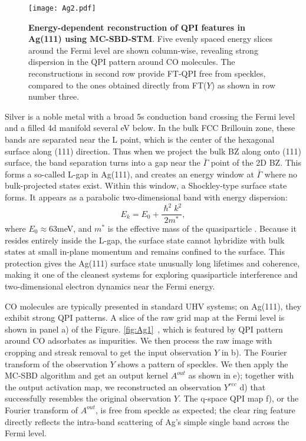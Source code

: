 \begin{figure}
	\texttt{[image: Ag2.pdf]} 
	\centering
	\caption[\textbf{Energy-dependent reconstruction of QPI features in Ag(111) using MC-SBD-STM}]{\textbf{Energy-dependent reconstruction of QPI features in Ag(111) using MC-SBD-STM}. Five evenly spaced energy slices around the Fermi level are shown column-wise, revealing strong dispersion in the QPI pattern around CO molecules. The reconstructions in second row provide FT-QPI free from speckles, compared to the ones obtained directly from FT($Y$) as shown in row number three.}
	\label{fig:Ag2}
\end{figure}

Silver is a noble metal with a broad 5s conduction band crossing the Fermi level and a filled 4d manifold several eV below. In the bulk FCC Brillouin zone, these bands are separated near the L point, which is the center of the hexagonal surface along (111) direction. Thus when we project the bulk BZ along onto (111) surface, the band separation turns into a gap near the $\bar{\Gamma}$ point of the 2D BZ. This forms a so-called L-gap in Ag(111), and creates an energy window at $\bar{\Gamma}$ where no bulk-projected states exist. Within this window, a Shockley-type surface state forms\cite{bendounanEvolutionRashbaSpinorbitsplit2011}\cite{burgiQuantumCoherenceLifetimes2000}. It appears as a parabolic two-dimensional band with energy dispersion:
\begin{equation}
	E_{k} = E_0 + \frac{\hslash^2k^2}{2m^*}, 
\end{equation}
where $E_0 \approx 63$meV, and $m^*$ is the effective mass of the quasiparticle \cite{paniagoTemperatureDependenceShockleytype1995}. Because it resides entirely inside the L-gap, the surface state cannot hybridize with bulk states at small in-plane momentum and remains confined to the surface. This protection gives the Ag(111) surface state unusually long lifetimes and coherence, making it one of the cleanest systems for exploring quasiparticle interference and two-dimensional electron dynamics near the Fermi energy. 
 
CO molecules are typically presented in standard UHV systems; on Ag(111), they exhibit strong QPI patterns. A slice of the raw grid map at the Fermi level is shown in panel a) of the Figure. \ref{fig:Ag1}~\cite{grotheQuantifyingManyBodyEffects2013a}, which is featured by QPI pattern around CO adsorbates as impurities. We then process the raw image with cropping and streak removal to get the input observation $Y$ in b). The Fourier transform of the observation $Y$ shows a pattern of speckles. We then apply the \ac{MC-SBD} algorithm and get an output kernel $A^{out}$ as shown in e); together with the output activation map, we reconstructed an observation $Y^{rec}$ d) that successfully resembles the original observation $Y$. The q-space QPI map f), or the Fourier transform of $A^{out}$, is free from speckle as expected; the clear ring feature directly reflects the intra-band scattering of Ag's simple single band across the Fermi level. 

